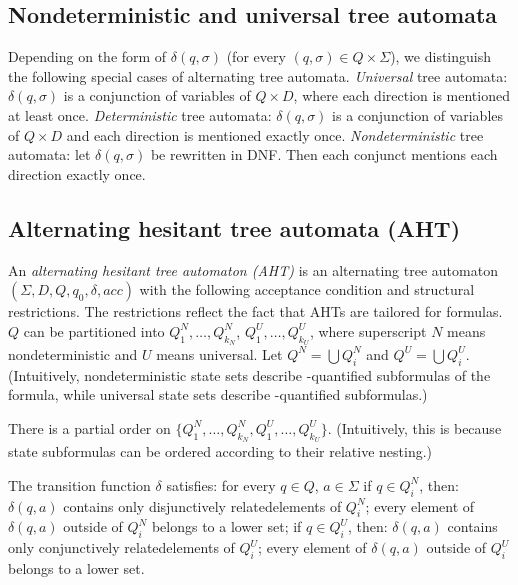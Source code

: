 \subsection*{Nondeterministic and universal tree automata}

Depending on the form of $\delta(q,\sigma)$ (for every $(q,\sigma) \in Q\times\Sigma$),
we distinguish the following special cases of alternating tree automata.
\li
\- \emph{Universal} tree automata:
   $\delta(q,\sigma)$ is a conjunction of variables of $Q\times D$,
   where each direction is mentioned at least once.
\- \emph{Deterministic} tree automata:
   $\delta(q,\sigma)$ is a conjunction of variables of $Q \times D$ and
   each direction is mentioned exactly once.
\- \emph{Nondeterministic} tree automata:
   let $\delta(q,\sigma)$ be rewritten in DNF.
   Then each conjunct mentions each direction exactly once.
\il


\subsection*{Alternating hesitant tree automata (AHT)} \label{page:defs:aht}

An \emph{alternating hesitant tree automaton (AHT)} is an alternating tree automaton
$(\Sigma, D, Q, q_0, \delta, acc)$
with the following acceptance condition and structural restrictions.
The restrictions reflect the fact that AHTs are tailored for \CTLstar formulas.
\li 
\- $Q$ can be partitioned into $Q^N_1,\dots ,Q^N_{k_N}$, $Q^U_1,\dots
,Q^U_{k_U}$, where superscript $N$ means
nondeterministic and $U$ means universal.
Let $Q^N = \bigcup Q^N_i$ and $Q^U = \bigcup Q^U_i$.
(Intuitively,
 nondeterministic state sets describe \E-quantified subformulas of the \CTLstar formula,
 while universal state sets describe \A-quantified subformulas.)

\- There is a partial order on $\{Q^N_1,\dots ,Q^N_{k_N},Q^U_1,\dots , Q^U_{k_U}\}$.
   (Intuitively, this is because state subformulas can
    be ordered according to their relative nesting.)

\- The transition function $\delta$ satisfies: for every $q \in Q$, $a \in \Sigma$
   \li
   \- if $q \in Q^N_i$, then:
      $\delta(q,a)$ contains only disjunctively related\footnotemark[1] elements of $Q^N_i$;
      every element of $\delta(q,a)$ outside of $Q^N_i$ belongs to a lower set;
   \- if $q \in Q^U_i$, then:
      $\delta(q,a)$ contains only conjunctively related\footnotemark[1] elements of $Q^U_i$;
      every element of $\delta(q,a)$ outside of $Q^U_i$ belongs to a lower set.
   \il
\il
{}

